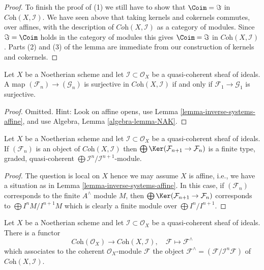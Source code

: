 \begin{proof}
\medskip\noindent
To finish the proof of (1) we still have to show that $\Coim = \Im$
in $\textit{Coh}(X, \mathcal{I})$. We have seen above that taking
kernels and cokernels commutes, over affines, with the description
of $\textit{Coh}(X, \mathcal{I})$ as a category of modules. Since
$\Im = \Coim$ holds in the category of modules
this gives $\Coim = \Im$ in $\textit{Coh}(X, \mathcal{I})$.
Parts (2) and (3) of the lemma are immediate from our construction
of kernels and cokernels.
\end{proof}

\begin{lemma}
\label{lemma-inverse-systems-surjective}
Let $X$ be a Noetherian scheme and let $\mathcal{I} \subset \mathcal{O}_X$
be a quasi-coherent sheaf of ideals. A map
$(\mathcal{F}_n) \to (\mathcal{G}_n)$ is surjective in
$\textit{Coh}(X, \mathcal{I})$
if and only if $\mathcal{F}_1 \to \mathcal{G}_1$ is surjective.
\end{lemma}

\begin{proof}
Omitted. Hint: Look on affine opens, use
Lemma \ref{lemma-inverse-systems-affine}, and use
Algebra, Lemma \ref{algebra-lemma-NAK}.
\end{proof}

\begin{lemma}
\label{lemma-finite-over-rees-algebra}
Let $X$ be a Noetherian scheme and let $\mathcal{I} \subset \mathcal{O}_X$
be a quasi-coherent sheaf of ideals. If $(\mathcal{F}_n)$ is an object of
$\textit{Coh}(X, \mathcal{I})$ then
$\bigoplus \Ker(\mathcal{F}_{n + 1} \to \mathcal{F}_n)$ is
a finite type, graded, quasi-coherent
$\bigoplus \mathcal{I}^n/\mathcal{I}^{n + 1}$-module.
\end{lemma}

\begin{proof}
The question is local on $X$ hence we may assume $X$ is affine, i.e.,
we have a situation as in Lemma \ref{lemma-inverse-systems-affine}.
In this case, if $(\mathcal{F}_n)$ corresponds to the finite $A^\wedge$
module $M$, then $\bigoplus \Ker(\mathcal{F}_{n + 1} \to \mathcal{F}_n)$
corresponds to $\bigoplus I^nM/I^{n + 1}M$ which is clearly a finite
module over $\bigoplus I^n/I^{n + 1}$.
\end{proof}

\noindent
Let $X$ be a Noetherian scheme and let $\mathcal{I} \subset \mathcal{O}_X$
be a quasi-coherent sheaf of ideals. There is a functor
\begin{equation}
\label{equation-completion-functor}
\textit{Coh}(\mathcal{O}_X) \longrightarrow \textit{Coh}(X, \mathcal{I}), \quad
\mathcal{F} \longmapsto \mathcal{F}^\wedge
\end{equation}
which associates to the coherent $\mathcal{O}_X$-module $\mathcal{F}$
the object $\mathcal{F}^\wedge = (\mathcal{F}/\mathcal{I}^n\mathcal{F})$
of $\textit{Coh}(X, \mathcal{I})$.

